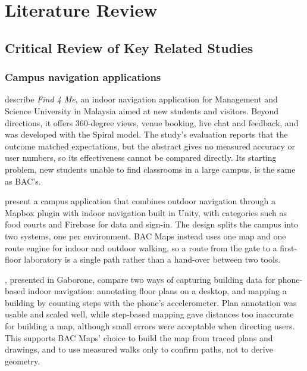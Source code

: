 \documentclass[12pt,a4paper]{report}
\begin{document}
\chapter{Literature Review}\label{ch:lit}

\section{Critical Review of Key Related Studies}

\subsection{Campus navigation applications}
\citet{helmi2022} describe \emph{Find 4 Me}, an indoor navigation application for Management and Science University in Malaysia aimed at new students and visitors. Beyond directions, it offers 360-degree views, venue booking, live chat and feedback, and was developed with the Spiral model. The study's evaluation reports that the outcome matched expectations, but the abstract gives no measured accuracy or user numbers, so its effectiveness cannot be compared directly. Its starting problem, new students unable to find classrooms in a large campus, is the same as BAC's.

\citet{patel2025} present a campus application that combines outdoor navigation through a Mapbox plugin with indoor navigation built in Unity, with categories such as food courts and Firebase for data and sign-in. The design splits the campus into two systems, one per environment. BAC Maps instead uses one map and one route engine for indoor and outdoor walking, so a route from the gate to a first-floor laboratory is a single path rather than a hand-over between two tools.

\citet{ausmeier2012}, presented in Gaborone, compare two ways of capturing building data for phone-based indoor navigation: annotating floor plans on a desktop, and mapping a building by counting steps with the phone's accelerometer. Plan annotation was usable and scaled well, while step-based mapping gave distances too inaccurate for building a map, although small errors were acceptable when directing users. This supports BAC Maps' choice to build the map from traced plans and drawings, and to use measured walks only to confirm paths, not to derive geometry.
\end{document}
